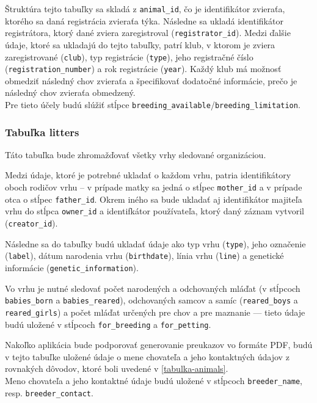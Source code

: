 Štruktúra tejto tabuľky sa skladá z \texttt{animal_id}, čo je identifikátor zvieraťa, ktorého sa daná registrácia zvieraťa týka. Následne sa ukladá identifikátor registrátora, ktorý dané zviera zaregistroval (\texttt{registrator_id}). Medzi ďalšie údaje, ktoré sa ukladajú do tejto tabuľky, patrí klub, v ktorom je zviera zaregistrované (\texttt{club}), typ registrácie (\texttt{type}), jeho registračné číslo \\ (\texttt{registration_number}) a rok registrácie (\texttt{year}). 
Každý klub má možnosť obmedziť následný chov zvieraťa a špecifikovať dodatočné informácie, prečo je následný chov zvieraťa obmedzený. \\ Pre tieto účely budú slúžiť stĺpce \texttt{breeding_available}/\texttt{breeding_limitation}.

\subsubsection{Tabuľka litters}
Táto tabuľka bude zhromažďovať všetky vrhy sledované organizáciou.

Medzi údaje, ktoré je potrebné ukladať o každom vrhu, patria identifikátory oboch rodičov vrhu -- v prípade matky sa jedná o stĺpec \texttt{mother_id} a v prípade otca o stĺpec \texttt{father_id}. Okrem iného sa bude ukladať aj identifikátor majiteľa vrhu do stĺpca \texttt{owner_id} a identifkátor používateľa, ktorý daný záznam vytvoril (\texttt{creator_id}).

Následne sa do tabuľky budú ukladať údaje ako typ vrhu (\texttt{type}), jeho označenie (\texttt{label}), dátum narodenia vrhu (\texttt{birthdate}), línia vrhu (\texttt{line}) a genetické informácie (\texttt{genetic_information}).

Vo vrhu je nutné sledovať počet narodených a odchovaných mláďat (v stĺpcoch \texttt{babies_born} a \texttt{babies_reared}), odchovaných samcov a samíc (\texttt{reared_boys} a \texttt{reared_girls}) a počet mláďat určených pre chov a pre maznanie --- tieto údaje budú uložené v stĺpcoch \texttt{for_breeding} a \texttt{for_petting}.

Nakoľko aplikácia bude podporovať generovanie preukazov vo formáte PDF, budú v tejto tabuľke uložené údaje o mene chovateľa a jeho kontaktných údajov z rovnakých dôvodov, ktoré boli uvedené v \ref{tabulka-animals}. \\ Meno chovateľa
a jeho kontaktné údaje budú uložené v stĺpcoch \texttt{breeder_name}, resp. \texttt{breeder_contact}.

